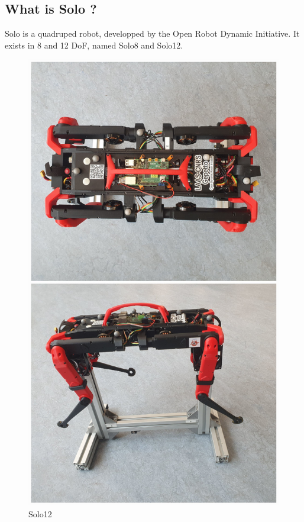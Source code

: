 \documentclass[a4paper,10pt]{article}
\begin{document}
\subsection{What is Solo ?}
\label{explanation_solo}
Solo is a quadruped robot, developped by the Open Robot Dynamic Initiative. It exists in 8 and 12 DoF, named Solo8 and Solo12.
\begin{figure}[H]
\centering
  \includegraphics[width=\linewidth, angle=0, scale=0.5]{./images/Solo3.jpg}
  \caption{Solo12}
\end{figure}
\end{document}
